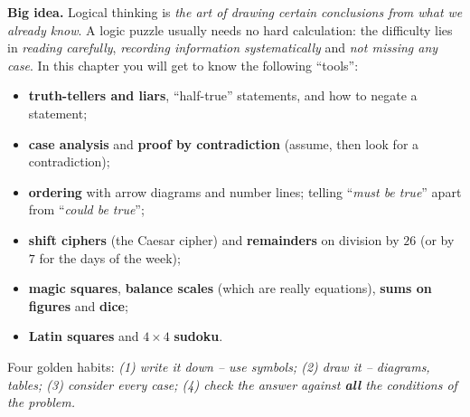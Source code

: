 \documentclass[11pt]{article}
\begin{document}
\begin{knowbox}
\textbf{Big idea.} Logical thinking is \emph{the art of drawing certain conclusions from what we already know}. A logic puzzle
usually needs no hard calculation: the difficulty lies in \emph{reading carefully}, \emph{recording information systematically} and
\emph{not missing any case}. In this chapter you will get to know the following ``tools'':
\begin{itemize}[leftmargin=1.4em,itemsep=1pt,topsep=2pt]
  \item \textbf{truth-tellers and liars}, ``half-true'' statements, and how to negate a statement;
  \item \textbf{case analysis} and \textbf{proof by contradiction} (assume, then look for a contradiction);
  \item \textbf{ordering} with arrow diagrams and number lines; telling ``\emph{must be true}'' apart from ``\emph{could be true}'';
  \item \textbf{shift ciphers} (the Caesar cipher) and \textbf{remainders} on division by $26$ (or by $7$ for the days of the week);
  \item \textbf{magic squares}, \textbf{balance scales} (which are really equations), \textbf{sums on figures} and \textbf{dice};
  \item \textbf{Latin squares} and $4\times 4$ \textbf{sudoku}.
\end{itemize}
Four golden habits: \emph{(1) write it down -- use symbols; (2) draw it -- diagrams, tables; (3) consider every case; (4) check the
answer against \textbf{all} the conditions of the problem.}
\end{knowbox}
\vspace{0.3cm}
\end{document}
